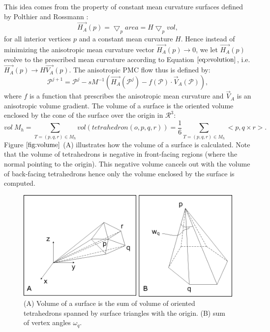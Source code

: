 \documentclass[11pt]{article}
\begin{document}
This idea comes from the property of constant mean curvature surfaces defined by Polthier and Rossmann \cite{PolthierRossmann2002}:
\begin{equation}
\vec{H_A}(p) = \bigtriangledown_p area = H \bigtriangledown_p vol,
\label{eq:evolution}
\end{equation}
for all interior vertices $p$ and a constant mean curvature $H$. Hence instead of minimizing the anisotropic mean curvature vector $\vec{H_A}(p) \rightarrow 0$, we let $\vec{H_A}(p)$ evolve to the prescribed mean curvature according to Equation $\ref{eq:evolution}$, i.e. $\vec{H_A}(p) \rightarrow H\vec{V_A}(p)$. The anisotropic PMC flow thus is defined by:
\begin{equation}
\mathcal{P}^{j+1} = \mathcal{P}^j -sM^{-1}(\vec{H_A}(\mathcal{P}^j) - f(\mathcal{P}) \cdot \vec{V}_A(\mathcal{P})),
\label{eq:pmc}
\end{equation}
where $f$ is a function that prescribes the anisotropic mean curvature and $\vec{V}_A$ is an anisotropic volume gradient. The volume of a surface is the oriented volume enclosed by the cone of the surface over the origin in $\mathcal{R}^3$:
\begin{equation}
vol \ M_h = \sum\limits_{T=(p, q, r) \in M_h}vol(tetrahedron(o, p, q, r)) = \frac{1}{6}\sum\limits_{T=(p, q, r) \in M_h}<p, q \times r>.
\label{eq:volume}
\end{equation}
Figure $\ref{fig:volume}$ (A) illustrates how the volume of a surface is calculated. Note that the volume of tetrahedrons is negative in front-facing regions (where the normal pointing to the origin). This negative volume cancels out with the volume of back-facing tetrahedrons hence only the volume enclosed by the surface is computed.

\begin{figure}[htbp]
\centering
\includegraphics[width=\textwidth]{fig67.png}
\caption{(A) Volume of a surface is the sum of volume of oriented tetrahedrons spanned by surface triangles with the origin. (B) sum of vertex angles $\omega_q$.}
\label{fig:volume}
\end{figure}
\end{document}
